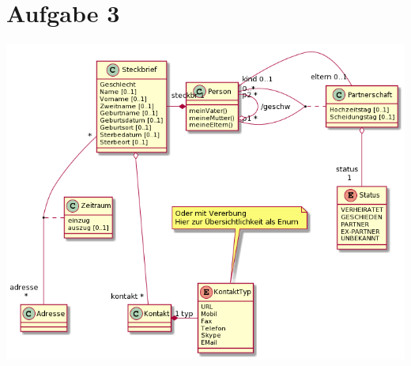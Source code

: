 \documentclass{article}
\begin{document}
	\section*{Aufgabe 3}
	\begin{center}
		\includegraphics[width=1\textwidth]{./Aufgabe10_3}
	\end{center}
	
\end{document}
